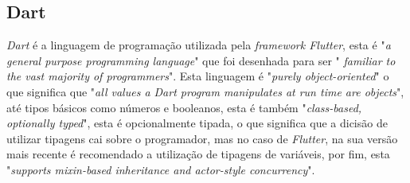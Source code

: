 \subsection{Dart}
\textit{Dart} é a linguagem de programação utilizada pela \textit{framework Flutter}, esta é "\emph{a general purpose programming language}"\citep{dart_pg_lang} que foi desenhada para ser "\emph{  familiar  to  the  vast  majority  of  programmers}"\citep{dart_pg_lang}. Esta linguagem é "\emph{purely  object-oriented}" o que significa que "\emph{all values a Dart program manipulates at run time are objects}"\citep{dart_pg_lang}, até tipos básicos como números e booleanos, esta é também  "\emph{class-based,  optionally  typed}"\citep{dart_pg_lang}, esta é opcionalmente tipada, o que significa que a dicisão de utilizar tipagens cai sobre o programador, mas no caso de \textit{Flutter}, na sua versão mais recente é recomendado a utilização de tipagens de variáveis, por fim, esta "\emph{supports  mixin-based inheritance and actor-style concurrency}"\citep{dart_pg_lang}.